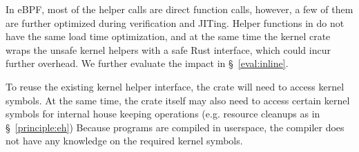 In eBPF, most of the helper calls are direct function calls, however, a few of
    them are further optimized during verification and JITing.
Helper functions in \projname{} do not have the same load time optimization,
    and at the same time the kernel crate wraps the unsafe kernel helpers with
    a safe Rust interface, which could incur further overhead.
We further evaluate the impact in \S~\ref{eval:inline}.


To reuse the existing kernel helper interface, the crate will need to access
    kernel symbols.
At the same time, the crate itself may also need to access certain kernel
    symbols for internal house keeping operations (e.g. resource cleanups as in
    \S~\ref{principle:eh})
Because \projname{} programs are compiled in userspace, the compiler does not
    have any knowledge on the required kernel symbols.

